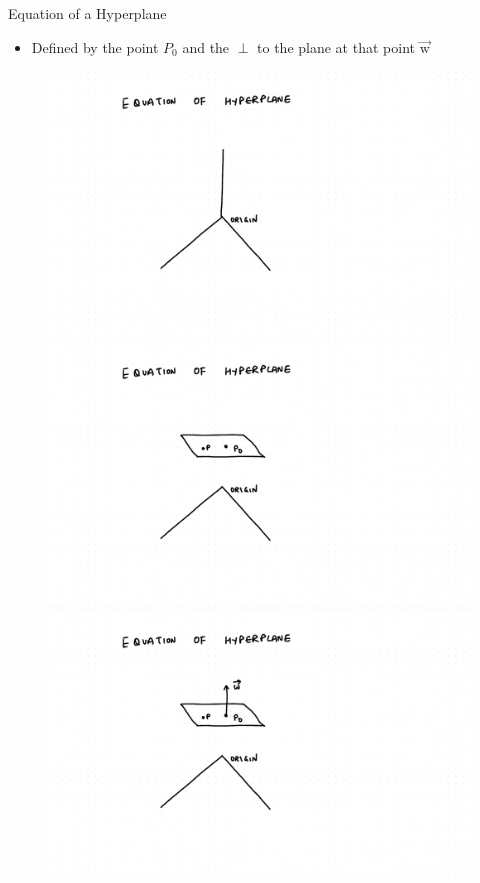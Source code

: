 \documentclass{beamer}
\begin{document}
\begin{frame}{Equation of a Hyperplane}

\begin{itemize}
	\item Defined by the point $P_{0}$ and the $\perp$ to the plane at that point $\overrightarrow{\text{w}}$
\end{itemize}

\begin{figure}
\begin{overprint}
 \includegraphics[scale=0.5]{./SVM/Svm-12.pdf}
 \includegraphics[scale=0.5]{./SVM/Svm-13.pdf}
 \includegraphics[scale=0.5]{./SVM/Svm-14.pdf}

\end{overprint}
\end{figure}
\end{frame}
\end{document}

